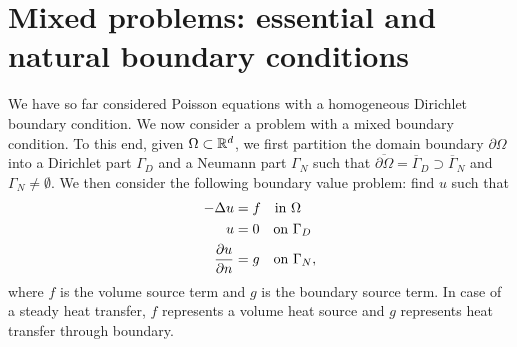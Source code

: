 \section{Mixed problems: essential and natural boundary conditions}
\label{sec:posnd_mixed}
We have so far considered Poisson equations with a homogeneous Dirichlet boundary condition.  We now consider a problem with a mixed boundary condition. To this end, given $\Omega \subset \mathbb{R}^d$, we first partition the domain boundary $\partial \Omega$ into a Dirichlet part $\Gamma_D$ and a Neumann part $\Gamma_N$ such that $\overline{\partial \Omega} = \overline \Gamma_D \supset \overline \Gamma_N$ and $\Gamma_N \neq \emptyset$.  We then consider the following boundary value problem: find $u$ such that
\begin{align}
  -\Delta u &= f \quad \text{in } \Omega \notag \\
  u &= 0 \quad \text{on } \Gamma_D \label{eq:posnd_mixed_bc_strong} \\
  \frac{\partial u}{\partial n} &= g \quad \text{on } \Gamma_N, \notag
\end{align}
where $f$ is the volume source term and $g$ is the boundary source term.  In case of a steady heat transfer, $f$ represents a volume heat source and $g$ represents heat transfer through boundary.


